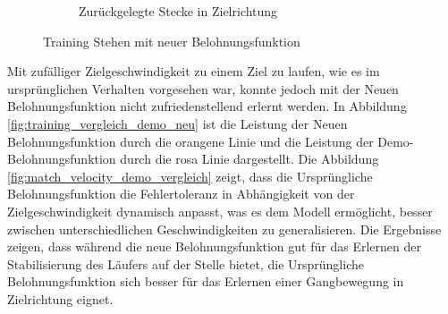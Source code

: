 \begin{figure}[H]
\begin{subfigure}{.49\textwidth}
      \caption{Zurückgelegte Stecke in Zielrichtung}
      \label{fig:126_move_target_dir}
    \end{subfigure}
  \caption{Training Stehen mit neuer Belohnungsfunktion}
  \label{fig:training_stehen_neu}
\end{figure}

Mit zufälliger Zielgeschwindigkeit zu einem Ziel zu laufen, wie es im ursprünglichen Verhalten vorgesehen war, konnte jedoch mit der Neuen Belohnungsfunktion nicht zufriedenstellend erlernt werden. In Abbildung \ref{fig:training_vergleich_demo_neu} ist die Leistung der Neuen Belohnungsfunktion durch die orangene Linie und die Leistung der Demo-Belohnungsfunktion durch die rosa Linie dargestellt. Die Abbildung \ref{fig:match_velocity_demo_vergleich} zeigt, dass die Ursprüngliche Belohnungsfunktion die Fehlertoleranz in Abhängigkeit von der Zielgeschwindigkeit dynamisch anpasst, was es dem Modell ermöglicht, besser zwischen unterschiedlichen Geschwindigkeiten zu generalisieren. Die Ergebnisse zeigen, dass während die neue Belohnungsfunktion gut für das Erlernen der Stabilisierung des Läufers auf der Stelle bietet, die Ursprüngliche Belohnungsfunktion sich besser für das Erlernen einer Gangbewegung in Zielrichtung eignet.

